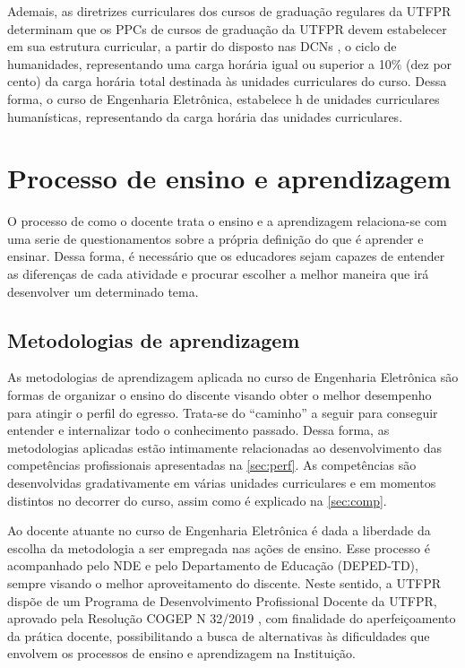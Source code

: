 Ademais, as diretrizes curriculares dos cursos de graduação regulares da UTFPR \cite{cogep142} determinam que os PPCs de cursos de graduação da UTFPR devem estabelecer em sua estrutura curricular, a partir do disposto nas DCNs \cite{dcneng}, o ciclo de humanidades, representando uma carga horária igual ou superior a 10$\%$ (dez por cento) da carga horária total destinada às unidades curriculares do curso. Dessa forma, o curso de Engenharia Eletrônica, estabelece \the\value{horasH} h de unidades curriculares humanísticas, representando \percentagem{\the\value{horasH}}{\the\value{horasUC}} da carga horária das unidades curriculares.

\section{Processo de ensino e aprendizagem}

O processo de como o docente trata o ensino e a aprendizagem relaciona-se com uma serie de questionamentos sobre a própria definição do que é aprender e ensinar. Dessa forma, é necessário que os educadores sejam capazes de entender as diferenças de cada atividade e procurar escolher a melhor maneira que irá desenvolver um determinado tema. 

\subsection{Metodologias de aprendizagem}

As metodologias de aprendizagem aplicada no curso de Engenharia Eletrônica são formas de organizar o ensino do discente visando obter o melhor desempenho para atingir o perfil do egresso. Trata-se do ``caminho'' a seguir para conseguir entender e internalizar todo o conhecimento passado. Dessa forma, as metodologias aplicadas estão intimamente relacionadas ao desenvolvimento das competências profissionais apresentadas na \autoref{sec:perf}. As competências são desenvolvidas gradativamente em várias unidades curriculares e em momentos distintos no decorrer do curso, assim como é explicado na \autoref{sec:comp}.

Ao docente atuante no curso de Engenharia Eletrônica é dada a liberdade da escolha da metodologia a ser empregada nas ações de ensino. Esse processo é acompanhado pelo NDE e pelo Departamento de Educação (DEPED-TD), sempre visando o melhor aproveitamento do discente. Neste sentido, a UTFPR dispõe de um Programa de Desenvolvimento Profissional Docente da UTFPR, aprovado pela Resolução COGEP N\textordmasculine{} 32/2019 \cite{cogep32}, com finalidade do aperfeiçoamento da prática docente, possibilitando a busca de alternativas às dificuldades que envolvem os processos de ensino e aprendizagem na Instituição.

